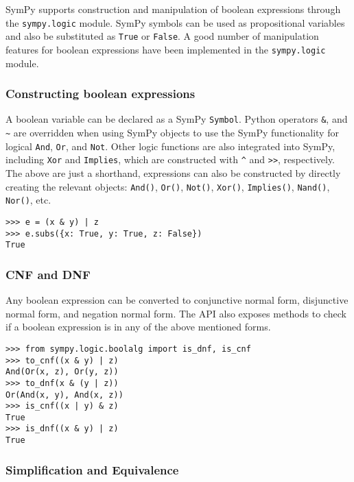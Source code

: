 
SymPy supports construction and manipulation of boolean expressions
through the \texttt{sympy.logic} module. SymPy symbols can be used as
propositional variables and also be substituted as \texttt{True}
or \texttt{False}. A good number of manipulation features for boolean
expressions have been implemented in the \texttt{sympy.logic} module.

\subsubsection{Constructing boolean expressions}

A boolean variable can be declared as a SymPy \verb|Symbol|. Python operators
\texttt{\&}, \texttt{\textbar{}} and \texttt{\textasciitilde{}} are overridden
when using SymPy objects to use the SymPy functionality for logical
\texttt{And}, \texttt{Or}, and \texttt{Not}. Other logic functions are also
integrated into SymPy, including \texttt{Xor} and \texttt{Implies}, which are
constructed with \texttt{\^{}} and \texttt{\textgreater{}\textgreater{}},
respectively. The above are just a shorthand, expressions can also be
constructed by directly creating the relevant objects: \verb|And()|,
\verb|Or()|, \verb|Not()|, \verb|Xor()|, \verb|Implies()|, \verb|Nand()|,
\verb|Nor()|, etc.

\begin{verbatim}
>>> e = (x & y) | z
>>> e.subs({x: True, y: True, z: False})
True
\end{verbatim}

\subsubsection{CNF and DNF}

Any boolean expression can be converted to conjunctive normal form, disjunctive
normal form, and negation normal form. The API also exposes methods to check if
a boolean expression is in any of the above mentioned forms.

\begin{verbatim}
>>> from sympy.logic.boolalg import is_dnf, is_cnf
>>> to_cnf((x & y) | z)
And(Or(x, z), Or(y, z))
>>> to_dnf(x & (y | z))
Or(And(x, y), And(x, z))
>>> is_cnf((x | y) & z)
True
>>> is_dnf((x & y) | z)
True
\end{verbatim}

\subsubsection{Simplification and Equivalence}


